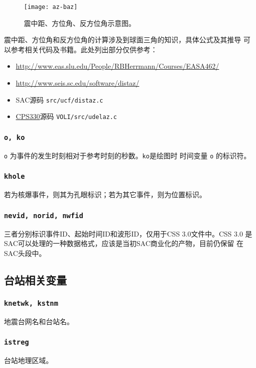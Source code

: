 \begin{figure}[H]
\centering
\texttt{[image: az-baz]}
\caption[震中距、方位角、反方位角示意图]{震中距、方位角、反方位角示意图。}
\label{fig:gcarc-dist-az-baz}
\end{figure}

震中距、方位角和反方位角的计算涉及到球面三角的知识，具体公式及其推导
可以参考相关代码及书籍。此处列出部分仅供参考：
\begin{itemize}
\item \url{http://www.eas.slu.edu/People/RBHerrmann/Courses/EASA462/}
\item \url{http://www.seis.sc.edu/software/distaz/}
\item SAC源码 \texttt{src/ucf/distaz.c}
\item \href{http://www.eas.slu.edu/eqc/eqccps.html}{CPS330}源码 \texttt{VOLI/src/udelaz.c}
\end{itemize}

\subsubsection{\texttt{o, ko}}
\texttt{o} 为事件的发生时刻相对于参考时刻的秒数。\texttt{ko}是绘图时
时间变量 \texttt{o} 的标识符。

\subsubsection{\texttt{khole}}
若为核爆事件，则其为孔眼标识；若为其它事件，则为位置标识。

\subsubsection{\texttt{nevid, norid, nwfid}}
三者分别标识事件ID、起始时间ID和波形ID，仅用于CSS 3.0文件中。CSS 3.0
是SAC可以处理的一种数据格式，应该是当初SAC商业化的产物，目前仍保留
在SAC头段中。

\subsection{台站相关变量}
\subsubsection{\texttt{knetwk, kstnm}}
地震台网名和台站名。

\subsubsection{\texttt{istreg}\dag}
台站地理区域。

